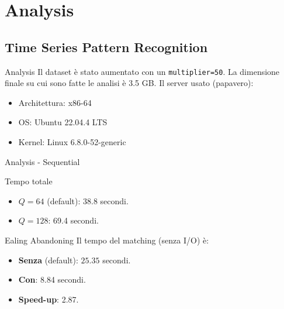 \section{Analysis}
\subsection{Time Series Pattern Recognition}

\begin{frame}{Analysis}
    Il dataset è stato aumentato con un \texttt{multiplier=50}. La dimensione finale su cui sono fatte le analisi è 3.5 GB.
    \vfill
    Il server usato (papavero):
    \begin{itemize}
        \item Architettura: x86-64
        \item OS: Ubuntu 22.04.4 LTS
        \item Kernel: Linux 6.8.0-52-generic
    \end{itemize}
\end{frame}

\begin{frame}{Analysis - Sequential}
    \begin{block}{Tempo totale}
        \begin{itemize}
            \item \textbf{$Q=64$} (default): 38.8 secondi.
            \item \textbf{$Q=128$}: 69.4 secondi.
        \end{itemize}
    \end{block}
    \begin{block}{Ealing Abandoning}
        Il tempo del matching (senza I/O) è:
        \begin{itemize}
            \item \textbf{Senza} (default): $25.35$ secondi.
            \item \textbf{Con}: 8.84 secondi.
            \item \textbf{Speed-up}: 2.87.
        \end{itemize}
    \end{block}
\end{frame}

